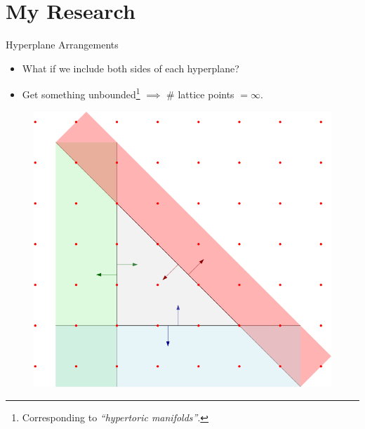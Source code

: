 \section{My Research}

\begin{frame}{Hyperplane Arrangements}

    \begin{itemize}
       \item What if we include both sides of each hyperplane?
       \item Get something unbounded\footnote{Corresponding to \emph{``hypertoric manifolds''}.} $\implies$ $\#$ lattice points $= \infty$.
    \end{itemize}

    \begin{figure}
        \includegraphics[scale=0.2]{resources/hyperplanes.png}
    \end{figure}

\end{frame}

